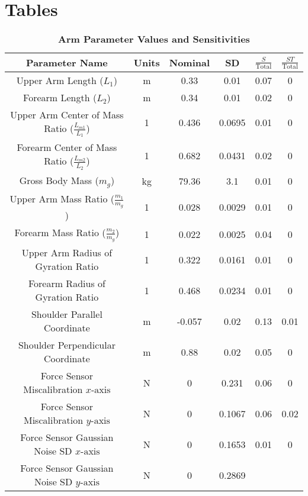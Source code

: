 \documentclass[10pt]{article}
\begin{document}
\section*{Tables}

\begin{table}[!ht]
\caption{
\bf{Arm Parameter Values and Sensitivities}}
\begin{tabular}{|c|c|c c|c c|}
\hline
Parameter Name &
Units &
Nominal &
SD &
$\frac{S}{\text{Total}}$ &
$\frac{ST}{\text{Total}}$ \\ \hline
Upper Arm Length ($L_1$) &
m &
0.33 &
0.01 &
0.07 &
0 \\
Forearm Length ($L_2$) &
m &
0.34 &
0.01 &
0.02 &
0 \\
Upper Arm Center of Mass Ratio ($\frac{L_{m1}}{L_1}$) &
1 &
0.436 &
0.0695 &
0.01 &
0 \\
Forearm Center of Mass Ratio ($\frac{L_{m2}}{L_2}$) &
1 &
0.682 &
0.0431 &
0.02 &
0 \\
Gross Body Mass ($m_g$) &
kg &
79.36 &
3.1 &
0.01 &
0 \\
Upper Arm Mass Ratio ($\frac{m_1}{m_g}$) &
1 &
0.028 &
0.0029 &
0.01 &
0 \\
Forearm Mass Ratio ($\frac{m_2}{m_g}$) &
1 &
0.022 &
0.0025 &
0.04 &
0 \\
Upper Arm Radius of Gyration Ratio &
1 &
0.322 &
0.0161 &
0.01 &
0 \\
Forearm Radius of Gyration Ratio &
1 &
0.468 &
0.0234 &
0.01 &
0 \\
Shoulder Parallel Coordinate &
m &
-0.057 &
0.02 &
0.13 &
0.01 \\
Shoulder Perpendicular Coordinate &
m &
0.88 &
0.02 &
0.05 &
0 \\
Force Sensor Miscalibration $x\text{-axis}$ &
N &
0 &
0.231 &
0.06 &
0 \\
Force Sensor Miscalibration $y\text{-axis}$ &
N &
0 &
0.1067 &
0.06 &
0.02 \\
Force Sensor Gaussian Noise SD $x\text{-axis}$ &
N &
0 &
0.1653 &
0.01 &
0 \\
Force Sensor Gaussian Noise SD $y\text{-axis}$ &
N &
0 &
0.2869 &

\end{tabular}
\end{table}
\end{document}
